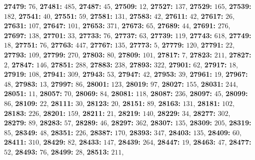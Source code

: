 \textsf{\bfseries 27479:} $76$, \textsf{\bfseries 27481:} $485$, \textsf{\bfseries 27487:} $45$, \textsf{\bfseries 27509:} $12$, \textsf{\bfseries 27527:} $137$, \textsf{\bfseries 27529:} $165$, \textsf{\bfseries 27539:} $182$, \textsf{\bfseries 27541:} $40$, \textsf{\bfseries 27551:} $59$, \textsf{\bfseries 27581:} $131$, \textsf{\bfseries 27583:} $42$, \textsf{\bfseries 27611:} $42$, \textsf{\bfseries 27617:} $26$, \textsf{\bfseries 27631:} $107$, \textsf{\bfseries 27647:} $101$, \textsf{\bfseries 27653:} $371$, \textsf{\bfseries 27673:} $65$, \textsf{\bfseries 27689:} $44$, \textsf{\bfseries 27691:} $276$, \textsf{\bfseries 27697:} $138$, \textsf{\bfseries 27701:} $33$, \textsf{\bfseries 27733:} $76$, \textsf{\bfseries 27737:} $63$, \textsf{\bfseries 27739:} $119$, \textsf{\bfseries 27743:} $618$, \textsf{\bfseries 27749:} $18$, \textsf{\bfseries 27751:} $76$, \textsf{\bfseries 27763:} $447$, \textsf{\bfseries 27767:} $135$, \textsf{\bfseries 27773:} $5$, \textsf{\bfseries 27779:} $120$, \textsf{\bfseries 27791:} $22$, \textsf{\bfseries 27793:} $109$, \textsf{\bfseries 27799:} $270$, \textsf{\bfseries 27803:} $80$, \textsf{\bfseries 27809:} $101$, \textsf{\bfseries 27817:} $7$, \textsf{\bfseries 27823:} $211$, \textsf{\bfseries 27827:} $2$, \textsf{\bfseries 27847:} $146$, \textsf{\bfseries 27851:} $288$, \textsf{\bfseries 27883:} $238$, \textsf{\bfseries 27893:} $322$, \textsf{\bfseries 27901:} $62$, \textsf{\bfseries 27917:} $18$, \textsf{\bfseries 27919:} $108$, \textsf{\bfseries 27941:} $309$, \textsf{\bfseries 27943:} $53$, \textsf{\bfseries 27947:} $42$, \textsf{\bfseries 27953:} $39$, \textsf{\bfseries 27961:} $19$, \textsf{\bfseries 27967:} $48$, \textsf{\bfseries 27983:} $13$, \textsf{\bfseries 27997:} $86$, \textsf{\bfseries 28001:} $123$, \textsf{\bfseries 28019:} $97$, \textsf{\bfseries 28027:} $155$, \textsf{\bfseries 28031:} $244$, \textsf{\bfseries 28051:} $11$, \textsf{\bfseries 28057:} $70$, \textsf{\bfseries 28069:} $84$, \textsf{\bfseries 28081:} $118$, \textsf{\bfseries 28087:} $236$, \textsf{\bfseries 28097:} $45$, \textsf{\bfseries 28099:} $86$, \textsf{\bfseries 28109:} $22$, \textsf{\bfseries 28111:} $30$, \textsf{\bfseries 28123:} $20$, \textsf{\bfseries 28151:} $89$, \textsf{\bfseries 28163:} $131$, \textsf{\bfseries 28181:} $102$, \textsf{\bfseries 28183:} $226$, \textsf{\bfseries 28201:} $159$, \textsf{\bfseries 28211:} $21$, \textsf{\bfseries 28219:} $140$, \textsf{\bfseries 28229:} $34$, \textsf{\bfseries 28277:} $302$, \textsf{\bfseries 28279:} $89$, \textsf{\bfseries 28283:} $57$, \textsf{\bfseries 28289:} $46$, \textsf{\bfseries 28297:} $362$, \textsf{\bfseries 28307:} $135$, \textsf{\bfseries 28309:} $205$, \textsf{\bfseries 28319:} $85$, \textsf{\bfseries 28349:} $48$, \textsf{\bfseries 28351:} $226$, \textsf{\bfseries 28387:} $170$, \textsf{\bfseries 28393:} $347$, \textsf{\bfseries 28403:} $135$, \textsf{\bfseries 28409:} $60$, \textsf{\bfseries 28411:} $310$, \textsf{\bfseries 28429:} $82$, \textsf{\bfseries 28433:} $147$, \textsf{\bfseries 28439:} $264$, \textsf{\bfseries 28447:} $19$, \textsf{\bfseries 28463:} $47$, \textsf{\bfseries 28477:} $52$, \textsf{\bfseries 28493:} $76$, \textsf{\bfseries 28499:} $28$, \textsf{\bfseries 28513:} $211$, 
